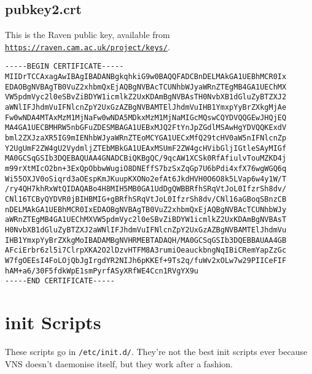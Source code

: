 \documentclass[a4paper,12pt]{report}
\begin{document}
\section{pubkey2.crt}
This is the Raven public key, available from \texttt{\url{https://raven.cam.ac.uk/project/keys/}}.
\begin{verbatim}
-----BEGIN CERTIFICATE-----
MIIDrTCCAxagAwIBAgIBADANBgkqhkiG9w0BAQQFADCBnDELMAkGA1UEBhMCR0Ix
EDAOBgNVBAgTB0VuZ2xhbmQxEjAQBgNVBAcTCUNhbWJyaWRnZTEgMB4GA1UEChMX
VW5pdmVyc2l0eSBvZiBDYW1icmlkZ2UxKDAmBgNVBAsTH0NvbXB1dGluZyBTZXJ2
aWNlIFJhdmVuIFNlcnZpY2UxGzAZBgNVBAMTElJhdmVuIHB1YmxpYyBrZXkgMjAe
Fw0wNDA4MTAxMzM1MjNaFw0wNDA5MDkxMzM1MjNaMIGcMQswCQYDVQQGEwJHQjEQ
MA4GA1UECBMHRW5nbGFuZDESMBAGA1UEBxMJQ2FtYnJpZGdlMSAwHgYDVQQKExdV
bml2ZXJzaXR5IG9mIENhbWJyaWRnZTEoMCYGA1UECxMfQ29tcHV0aW5nIFNlcnZp
Y2UgUmF2ZW4gU2VydmljZTEbMBkGA1UEAxMSUmF2ZW4gcHVibGljIGtleSAyMIGf
MA0GCSqGSIb3DQEBAQUAA4GNADCBiQKBgQC/9qcAW1XCSk0RfAfiulvTouMZKD4j
m99rXtMIcO2bn+3ExQpObbwWugiO8DNEffS7bzSxZqGp7U6bPdi4xfX76wgWGQ6q
Wi55OXJV0oSiqrd3aOEspKmJKuupKXONo2efAt6JkdHVH0O6O8k5LVap6w4y1W/T
/ry4QH7khRxWtQIDAQABo4H8MIH5MB0GA1UdDgQWBBRfhSRqVtJoL0IfzrSh8dv/
CNl16TCByQYDVR0jBIHBMIG+gBRfhSRqVtJoL0IfzrSh8dv/CNl16aGBoqSBnzCB
nDELMAkGA1UEBhMCR0IxEDAOBgNVBAgTB0VuZ2xhbmQxEjAQBgNVBAcTCUNhbWJy
aWRnZTEgMB4GA1UEChMXVW5pdmVyc2l0eSBvZiBDYW1icmlkZ2UxKDAmBgNVBAsT
H0NvbXB1dGluZyBTZXJ2aWNlIFJhdmVuIFNlcnZpY2UxGzAZBgNVBAMTElJhdmVu
IHB1YmxpYyBrZXkgMoIBADAMBgNVHRMEBTADAQH/MA0GCSqGSIb3DQEBBAUAA4GB
AFciErbr6zl5i7ClrpXKA2O2lDzvHTFM8A3rumiOeauckbngNqIBiCRemYapZzGc
W7fgOEEsI4FoLOjQbJgIrgdYR2NIJh6pKKEf+9Ts2q/fuWv2xOLw7w29PIICeFIF
hAM+a6/30F5fdkWpE1smPyrfASyXRfWE4Ccn1RVgYX9u
-----END CERTIFICATE-----
\end{verbatim}


\chapter{init Scripts}
These scripts go in \texttt{/etc/init.d/}.  They're not the best init scripts ever because VNS doesn't daemonise itself, but they work after a fashion.
\end{document}
